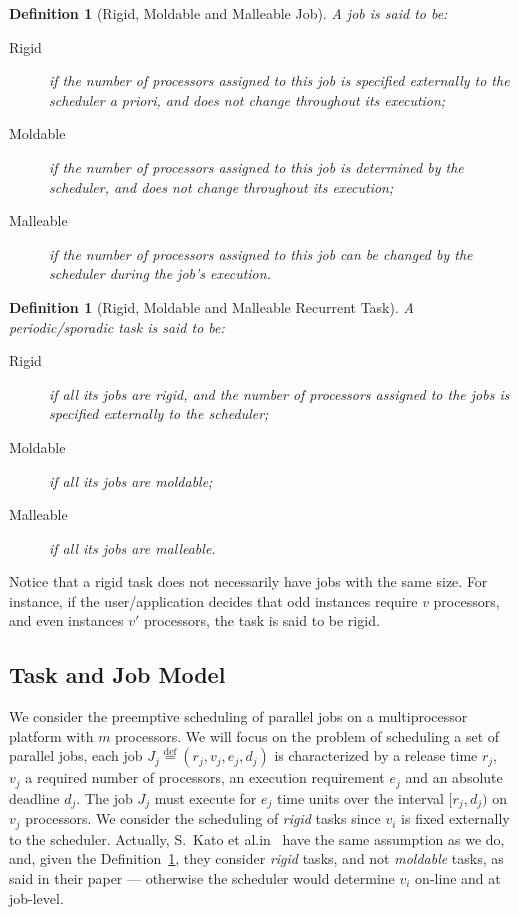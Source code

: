 \documentclass[a4paper]{article}
\newtheorem{definition}[theorem]{Definition}
\newcommand{\equals}{\stackrel{\mathrm{def}}{=}}
\begin{document}
\begin{definition}[Rigid, Moldable and Malleable Job]
A \emph{job} is said to be:
\begin{description}
\item[Rigid] if the number of processors assigned to this job is specified externally to the scheduler a priori, and does not change throughout its execution;
\item[Moldable] if the number of processors assigned to this job is determined by the scheduler, and does not change throughout its execution;
\item[Malleable] if the number of processors assigned to this job can be changed by the scheduler during the job's execution.
\end{description}
\end{definition}

\begin{definition}[Rigid, Moldable and Malleable Recurrent Task]\label{def:taskparallel}
A periodic/sporadic \emph{task} is said to be:
\begin{description}
\item [Rigid] if all its jobs are rigid, and the number of processors assigned to the jobs is specified externally to the scheduler;
\item [Moldable] if all its jobs are moldable;
\item [Malleable] if all its jobs are malleable.
\end{description}
\end{definition}

Notice that a rigid task does not necessarily have jobs with the same size. For instance, if the user/application decides that odd instances require $v$ processors, and even instances $v'$ processors, the task is said to be rigid.


\subsection{Task and Job Model}
We consider the preemptive scheduling of parallel jobs on a multiprocessor platform with $m$ processors. We will focus on the problem of scheduling a set of parallel jobs, each job $J_j \equals (r_{j}, v_{j}, e_{j}, d_{j})$ is characterized by a release time $r_j$, $v_{j}$ a required number of processors, an execution requirement $e_j$ and an absolute  deadline $d_j$. The job $J_j$ must execute for $e_j$ time units over the interval $[r_j,d_j)$ on $v_{j}$ processors. We consider the scheduling of \emph{rigid} tasks since $v_{i}$ is fixed externally to the scheduler. Actually, S.~Kato et al.\@ in~\cite{kato2009gang} have the same assumption as we do, and, given the Definition~\ref{def:taskparallel}, they consider \emph{rigid} tasks, and not \emph{moldable} tasks, as said in their paper --- otherwise the scheduler would determine $v_{i}$ on-line and at job-level. 
\end{document}
